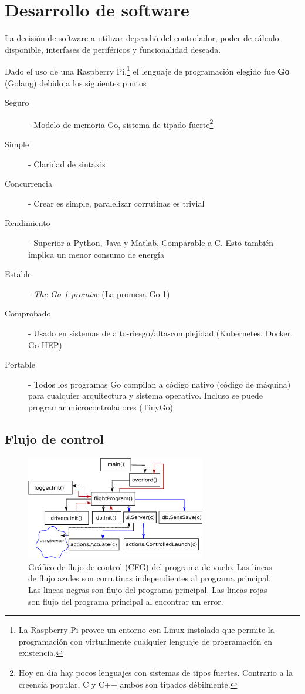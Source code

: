 \section{Desarrollo de software}

La decisión de software a utilizar dependió del controlador, poder de cálculo disponible, interfases de periféricos y funcionalidad deseada.

\medskip

Dado el uso de una Raspberry Pi,\footnote{La Raspberry Pi provee un entorno con Linux instalado que permite la programación con virtualmente cualquier lenguaje de programación en existencia.} el lenguaje de programación elegido fue \textbf{Go} (Golang) debido a los siguientes puntos

\begin{description}
    \item[Seguro] - Modelo de memoria Go, sistema de tipado fuerte\footnote{Hoy en día hay pocos lenguajes con sistemas de tipos fuertes. Contrario a la creencia popular, C y C++ ambos son tipados débilmente.}
    \item[Simple] - Claridad de sintaxis
    \item[Concurrencia] - Crear  es simple, paralelizar corrutinas es trivial
    \item[Rendimiento] - Superior a Python, Java y Matlab. Comparable a C. Esto también implica un menor consumo de energía
    \item[Estable] - \textit{The Go 1 promise} (La promesa Go 1)
    \item[Comprobado] -  Usado en sistemas de alto-riesgo/alta-complejidad (Kubernetes, Docker, Go-HEP)
    \item[Portable] - Todos los programas Go compilan a código nativo (código de máquina) para cualquier arquitectura y sistema operativo. Incluso se puede programar microcontroladores (TinyGo)
\end{description}

\subsection{Flujo de control}
\begin{figure}[!htb]
    \centering
    \includegraphics[width=0.7\textwidth]{fig/cfg_flightprogram.eps}
    \caption{Gráfico de flujo de control (CFG) del programa de vuelo. Las lineas de flujo azules son corrutinas independientes al programa principal. Las lineas negras son flujo del programa principal. Las lineas rojas son flujo del programa principal al encontrar un error.}
    \label{fig:flightProgram}
\end{figure}

